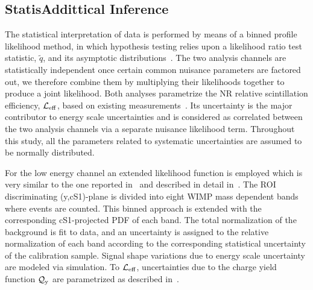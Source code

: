 
\subsection{StatisAddittical Inference }
\label{sec:LikelihoodFunction}
The statistical interpretation of data is performed by means of a binned profile likelihood method, in which hypothesis testing relies upon a likelihood ratio test statistic, $\tilde{q}$, 
and its asymptotic distributions~\cite{asympt}. The two analysis channels are statistically independent once certain common nuisance parameters are factored out, we therefore combine them by multiplying their likelihoods together to produce a joint likelihood.
Both analyses parametrize the NR relative scintillation efficiency, $\mathcal{L}_{\mathrm{eff}}$, based on existing measurements~\cite{run8Result}. Its uncertainty is the major contributor to energy scale uncertainties and is considered as correlated between the two analysis channels via a separate nuisance likelihood term.
Throughout this study, all the parameters related to systematic uncertainties are assumed to be normally distributed.

For the low energy channel an extended likelihood function is employed which is very similar to the one reported in~\cite{Aprile:2011hx} and described in detail in~\cite{xe100_run_combination}. 
The ROI discriminating (y,cS1)-plane is divided into eight WIMP mass dependent bands where events are counted. This binned approach is extended with the corresponding cS1-projected PDF of each band. The total normalization of the background is fit to data, and an uncertainty is assigned to the relative normalization of each band according to the corresponding statistical uncertainty of the calibration sample.
Signal shape variations due to energy scale uncertainty are modeled via simulation. To $\mathcal{L}_{\mathrm{eff}}$, uncertainties due to the charge yield function $\mathcal{Q}_{\mathrm{y}}$ are parametrized as described in~\cite{DataMCXenon}.

